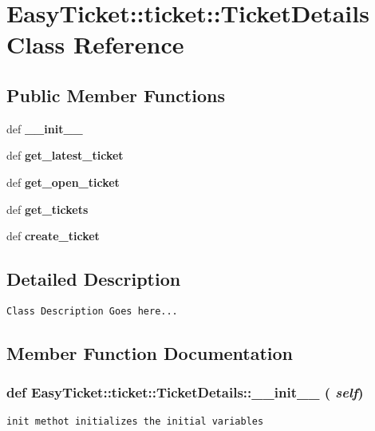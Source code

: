 \section{Easy\-Ticket::ticket::Ticket\-Details Class Reference}
\label{d0/d58/classEasyTicket_1_1ticket_1_1TicketDetails}
\subsection*{Public Member Functions}
\begin{CompactItemize}
\item 
def \bf{\_\-\_\-init\_\-\_\-}
\item 
def \bf{get\_\-latest\_\-ticket}
\item 
def \bf{get\_\-open\_\-ticket}
\item 
def \bf{get\_\-tickets}
\item 
def \bf{create\_\-ticket}
\end{CompactItemize}


\subsection{Detailed Description}


\footnotesize\begin{verbatim}Class Description Goes here...
\end{verbatim}
\normalsize
 



\subsection{Member Function Documentation}
\subsubsection{\setlength{\rightskip}{0pt plus 5cm}def Easy\-Ticket::ticket::Ticket\-Details::\_\-\_\-init\_\-\_\- ( {\em self})}\label{d0/d58/classEasyTicket_1_1ticket_1_1TicketDetails_ef241d9109b63cd7ea6d35719615c309}




\footnotesize\begin{verbatim}init methot initializes the initial variables
\end{verbatim}
\normalsize
